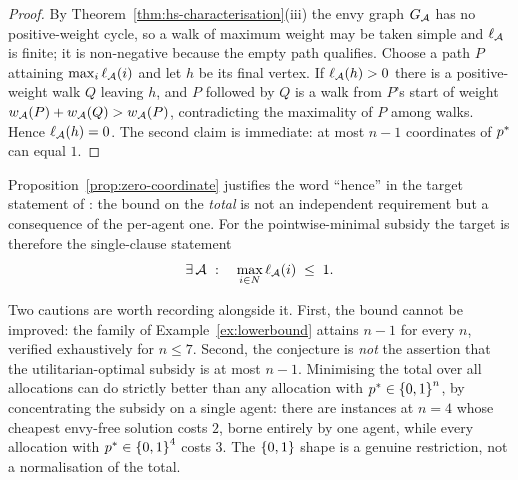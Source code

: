\begin{proof}
By Theorem~\ref{thm:hs-characterisation}(iii) the envy graph $G_{\mathcal{A}}$
has no positive-weight cycle, so a walk of maximum weight may be taken simple
and $\ell_{\mathcal{A}}$ is finite; it is non-negative because the empty path
qualifies. Choose a path $P$ attaining $\max_{i} \ell_{\mathcal{A}}(i)$ and let $h$
be its final vertex. If $\ell_{\mathcal{A}}(h) > 0$ there is a positive-weight walk
$Q$ leaving $h$, and $P$ followed by $Q$ is a walk from $P$'s start of weight
$w_{\mathcal{A}}(P) + w_{\mathcal{A}}(Q) > w_{\mathcal{A}}(P)$, contradicting the
maximality of $P$ among walks. Hence $\ell_{\mathcal{A}}(h) = 0$. The second claim is immediate: at
most $n-1$ coordinates of $p^{*}$ can equal $1$.
\end{proof}

Proposition~\ref{prop:zero-coordinate} justifies the word ``hence'' in the
target statement of : the bound on the \emph{total} is not an
independent requirement but a consequence of the per-agent one. For the
pointwise-minimal subsidy the target is therefore the single-clause statement
\[
  \exists\, \mathcal{A} \ :\quad \max_{i \in N} \ell_{\mathcal{A}}(i) \;\le\; 1 .
\]

\ifworking
Two cautions are worth recording alongside it. First, the bound cannot be improved: the family of
Example~\ref{ex:lowerbound} attains $n-1$ for every $n$, verified exhaustively
for $n \le 7$. Second, the conjecture is \emph{not} the assertion that the
utilitarian-optimal subsidy is at most $n-1$. Minimising the total over all
allocations can do strictly better than any allocation with
$p^{*} \in \left\{0,1\right\}^n$, by concentrating the subsidy on a single agent:
there are instances at $n = 4$ whose cheapest envy-free solution costs $2$, borne
entirely by one agent, while every allocation with $p^{*} \in \left\{0,1\right\}^4$
costs $3$. The $\left\{0,1\right\}$ shape is a genuine restriction, not a normalisation of
the total.
\fi
